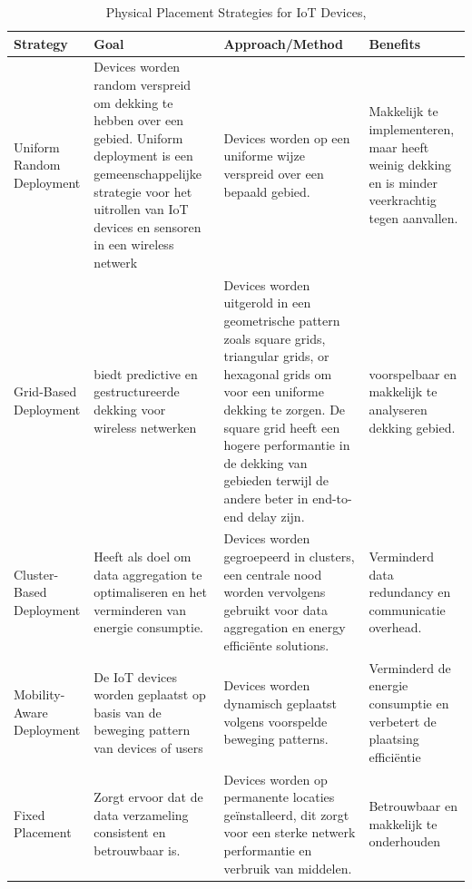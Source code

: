 \begin{table}[h]
    \centering
    \tiny
    \caption{Physical Placement Strategies for IoT Devices, \autocite{Tinglib2012, Alablani2019, Badiger2022, Chen2023, Krishnachalitha2020, Patil2021, Paul2020}}
    \begin{tabular}{|l|p{4cm}|p{5cm}|p{4cm}|} %
        \hline
        \textbf{Strategy} & \textbf{Goal} & \textbf{Approach/Method} & \textbf{Benefits} \\ \hline
        Uniform Random Deployment & Devices worden random verspreid om dekking te hebben over een gebied. Uniform deployment is een gemeenschappelijke strategie voor het uitrollen van IoT devices en sensoren in een wireless netwerk  & Devices worden op een uniforme wijze verspreid over een bepaald gebied. & Makkelijk te implementeren, maar heeft weinig dekking en is minder veerkrachtig tegen aanvallen. \\ \hline
        Grid-Based Deployment & biedt predictive en gestructureerde dekking voor wireless netwerken  & Devices worden uitgerold in een geometrische pattern zoals square grids, triangular grids, or hexagonal grids om voor een uniforme dekking te zorgen. De square grid heeft een hogere performantie in de dekking van gebieden terwijl de andere beter in end-to-end delay zijn. & voorspelbaar en makkelijk te analyseren dekking gebied. \\ \hline
        Cluster-Based Deployment & Heeft als doel om data aggregation te optimaliseren en het verminderen van energie consumptie. & Devices worden gegroepeerd in clusters, een centrale nood worden vervolgens gebruikt voor data aggregation en energy efficiënte solutions. & Verminderd data redundancy en communicatie overhead. \\ \hline
        Mobility-Aware Deployment & De IoT devices worden geplaatst op basis van de beweging pattern van devices of users & Devices worden dynamisch geplaatst volgens voorspelde beweging patterns. & Verminderd de energie consumptie en verbetert de plaatsing efficiëntie \\ \hline
        Fixed Placement & Zorgt ervoor dat de data verzameling consistent en betrouwbaar is. & Devices worden op permanente locaties geïnstalleerd, dit zorgt voor een sterke netwerk performantie en verbruik van middelen. & Betrouwbaar en makkelijk te onderhouden \\ \hline
    \end{tabular}
    \label{tab:placement_strategies}
\end{table}


